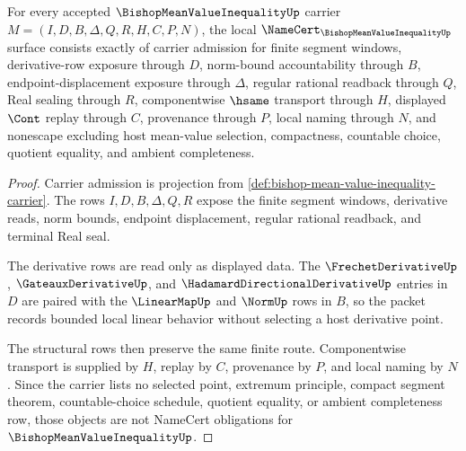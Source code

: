 \begin{theorem}
\label{thm:bishop-mean-value-inequality-namecert-obligations}
For every accepted $\BishopMeanValueInequalityUp$ carrier $M=(I,D,B,\Delta,Q,R,H,C,P,N)$, the local $\NameCert_{\BishopMeanValueInequalityUp}$ surface consists exactly of carrier admission for finite segment windows, derivative-row exposure through $D$, norm-bound accountability through $B$, endpoint-displacement exposure through $\Delta$, regular rational readback through $Q$, Real sealing through $R$, componentwise $\hsame$ transport through $H$, displayed $\Cont$ replay through $C$, provenance through $P$, local naming through $N$, and nonescape excluding host mean-value selection, compactness, countable choice, quotient equality, and ambient completeness.
\end{theorem}
\begin{proof}
Carrier admission is projection from \autoref{def:bishop-mean-value-inequality-carrier}. The rows $I,D,B,\Delta,Q,R$ expose the finite segment windows, derivative reads, norm bounds, endpoint displacement, regular rational readback, and terminal Real seal.

The derivative rows are read only as displayed data. The $\FrechetDerivativeUp$, $\GateauxDerivativeUp$, and $\HadamardDirectionalDerivativeUp$ entries in $D$ are paired with the $\LinearMapUp$ and $\NormUp$ rows in $B$, so the packet records bounded local linear behavior without selecting a host derivative point.

The structural rows then preserve the same finite route. Componentwise transport is supplied by $H$, replay by $C$, provenance by $P$, and local naming by $N$. Since the carrier lists no selected point, extremum principle, compact segment theorem, countable-choice schedule, quotient equality, or ambient completeness row, those objects are not NameCert obligations for $\BishopMeanValueInequalityUp$.
\end{proof}

